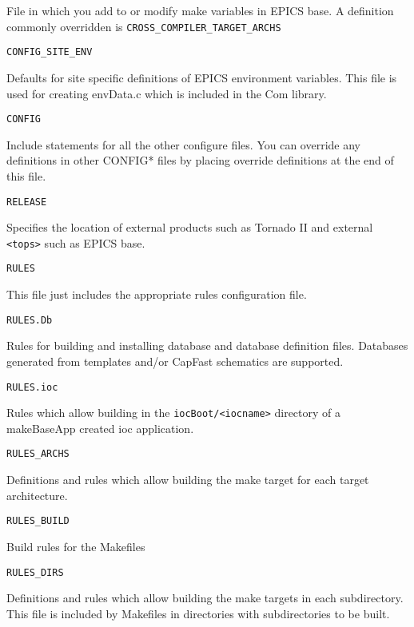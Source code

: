 \begin{description}
File in which you add to or modify make variables in EPICS base. A definition commonly overridden is \verb|CROSS_COMPILER_TARGET_ARCHS|

\item {}\verb|CONFIG_SITE_ENV|

Defaults for site specific definitions of EPICS environment variables. This file is used for creating envData.c 
which is included in the Com library.

\item {}\verb|CONFIG|

Include statements for all the other configure files. You can override any definitions in other CONFIG* files by 
placing override definitions at the end of this file.

\item {}\verb|RELEASE|

Specifies the location of external products such as Tornado II and external \verb|<tops>| such as EPICS base. 

\item {}\verb|RULES|

This file just includes the appropriate rules configuration file.

\item {}\verb|RULES.Db|

Rules for building and installing database and database definition files. Databases generated from templates and/or 
CapFast schematics are supported.

\item {}\verb|RULES.ioc|

Rules which allow building in the \verb|iocBoot/<iocname>| directory of a makeBaseApp created ioc application.

\item {}\verb|RULES_ARCHS|

Definitions and rules which allow building the make target for each target architecture.

\item {}\verb|RULES_BUILD|

Build rules for the Makefiles 

\item {}\verb|RULES_DIRS|

Definitions and rules which allow building the make targets in each subdirectory. This file is included by Makefiles 
in directories with subdirectories to be built.


\end{description}
